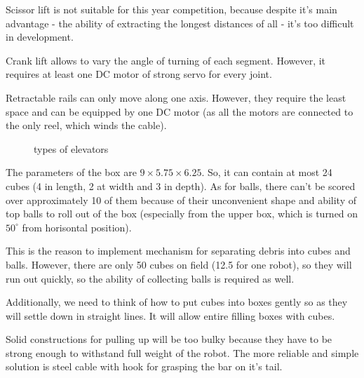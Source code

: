 \begin{enumerate*}
		Scissor lift is not suitable for this year competition, because despite it's main advantage - the ability of extracting the longest distances of all - it's too difficult in development.
		
		Crank lift allows to vary the angle of turning of each segment. However, it requires at least one DC motor of strong servo for every joint.
		
		Retractable rails can only move along one axis. However, they require the least space and can be equipped by one DC motor (as all the motors are connected to the only reel, which winds the cable).
		\begin{figure}[H]
			\begin{minipage}[h]{1\linewidth}
				\caption{types of elevators}
			\end{minipage}
		\end{figure}
		\item The parameters of the box are $9\times5.75\times6.25$. So, it can contain at most 24 cubes (4 in length, 2 at width and 3 in depth). As for balls, there can't be scored over approximately 10 of them because of their unconvenient shape and ability of top balls to roll out of the box (especially from the upper box, which is turned on $50^{\circ}$ from horisontal position).
		
		This is the reason to implement mechanism for separating debris into cubes and balls. However, there are only 50 cubes on field (12.5 for one robot), so they will run out quickly, so the ability of collecting balls is required as well.
		
		Additionally, we need to think of how to put cubes into boxes gently so as they will settle down in straight lines. It will allow entire filling boxes with cubes.\newline
		\item Solid constructions for pulling up will be too bulky because they have to be strong enough to withstand full weight of the robot. The more reliable and simple solution is steel cable with hook for grasping the bar on it's tail.
		

\end{enumerate*}

